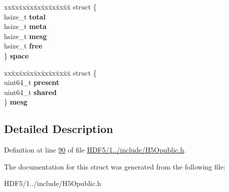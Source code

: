\begin{DoxyCompactItemize}
\begin{tabbing}
\end{tabbing}\item 
\mbox{\label{struct_h5_o__hdr__info__t_a5e8865cddbbf3546d4032ffabb159d63}} 
\begin{tabbing}
xx\=xx\=xx\=xx\=xx\=xx\=xx\=xx\=xx\=\kill
struct \{\\
\>hsize\_t {\bfseries total}\\
\>hsize\_t {\bfseries meta}\\
\>hsize\_t {\bfseries mesg}\\
\>hsize\_t {\bfseries free}\\
\} {\bfseries space}\\

\end{tabbing}\item 
\mbox{\label{struct_h5_o__hdr__info__t_ac9b52b193fcaec38b690356681b4074e}} 
\begin{tabbing}
xx\=xx\=xx\=xx\=xx\=xx\=xx\=xx\=xx\=\kill
struct \{\\
\>uint64\_t {\bfseries present}\\
\>uint64\_t {\bfseries shared}\\
\} {\bfseries mesg}\\

\end{tabbing}\end{DoxyCompactItemize}


\subsection{Detailed Description}


Definition at line \hyperlink{_h_d_f5_21_810_81_2include_2_h5_opublic_8h_source_l00090}{90} of file \hyperlink{_h_d_f5_21_810_81_2include_2_h5_opublic_8h_source}{H\+D\+F5/1../include/\+H5\+Opublic.\+h}.



The documentation for this struct was generated from the following file\+:\begin{DoxyCompactItemize}
\item 
H\+D\+F5/1../include/\+H5\+Opublic.\+h\end{DoxyCompactItemize}
